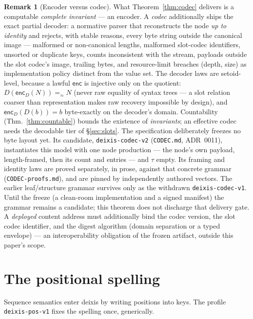 \documentclass[11pt]{article}
\theoremstyle{definition}
\newtheorem{remark}[theorem]{Remark}
\newcommand{\eqS}{=_{\approx}}                     %
\newcommand{\enc}{\mathsf{enc}}
\newcommand{\encD}{\mathsf{enc}_{\!D}}
\begin{document}
\begin{remark}[Encoder versus codec]\label{rem:codecword}
What Theorem~\ref{thm:codec} delivers is a computable \emph{complete invariant} ---
an encoder. A \emph{codec} additionally ships the exact partial decoder: a normative
parser that reconstructs the node \emph{up to identity} and rejects, with stable
reasons, every byte string outside the canonical image --- malformed or non-canonical
lengths, malformed slot-codec identifiers, unsorted or duplicate keys, counts
inconsistent with the stream, payloads outside the slot codec's image, trailing bytes,
and resource-limit breaches (depth, size) as implementation policy distinct from the
value set. The decoder laws are setoid-level, because a
lawful $\enc$ is injective only on the quotient: $D(\encD(N)) \eqS N$ (never raw
equality of syntax trees --- a slot relation coarser than representation makes raw
recovery impossible by design), and $\encD(D(b)) = b$ byte-exactly on the decoder's
domain. Countability (Thm.~\ref{thm:countable}) bounds the existence of
\emph{invariants}; an effective codec needs the decodable tier of \S\ref{sec:slots}.
The specification deliberately freezes no byte layout yet. Its candidate,
\texttt{deixis-codec-v2} (\texttt{CODEC.md}, ADR~0011), instantiates this model with
one node production --- the node's own payload, length-framed, then its count and
entries --- and $\tau$ empty. Its framing and identity laws are proved separately, in
prose, against that concrete grammar (\texttt{CODEC-proofs.md}), and are pinned by
independently authored vectors. The earlier leaf/structure grammar survives only as the
withdrawn \texttt{deixis-codec-v1}. Until the freeze (a clean-room implementation and
a signed manifest) the grammar remains a candidate; this theorem does not discharge
that delivery gate. A \emph{deployed} content address must additionally
bind the codec version, the slot codec identifier, and the digest algorithm (domain
separation or a typed envelope) --- an interoperability obligation of the frozen
artifact, outside this paper's scope.
\end{remark}

\section{The positional spelling}\label{sec:pos}

Sequence semantics enter deixis by writing positions into keys. The profile
\texttt{deixis-pos-v1} fixes the spelling once, generically.
\end{document}
